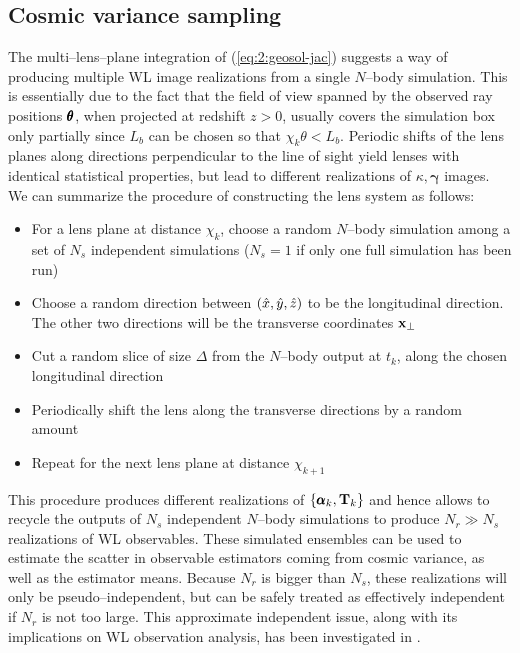 \subsection{Cosmic variance sampling}
\label{sec:3:sampling}
The multi--lens--plane integration of (\ref{eq:2:geosol-jac}) suggests a way of producing multiple WL image realizations from a single $N$--body simulation. This is essentially due to the fact that the field of view spanned by the observed ray positions $\pmb{\theta}$, when projected at redshift $z>0$, usually covers the simulation box only partially since $L_b$ can be chosen so that $\chi_k\theta<L_b$. Periodic shifts of the lens planes along directions perpendicular to the line of sight yield lenses with identical statistical properties, but lead to different realizations of $\kappa,\pmb{\gamma}$ images. We can summarize the procedure of constructing the lens system as follows:

\begin{itemize}
\item For a lens plane at distance $\chi_k$, choose a random $N$--body simulation among a set of $N_s$ independent simulations ($N_s=1$ if only one full simulation has been run)
\item Choose a random direction between $(\hat{x},\hat{y},\hat{z})$ to be the longitudinal direction. The other two directions will be the transverse coordinates $\mathbf{x}_\perp$
\item Cut a random slice of size $\Delta$ from the $N$--body output at $t_k$, along the chosen longitudinal direction
\item Periodically shift the lens along the transverse directions by a random amount
\item Repeat for the next lens plane at distance $\chi_{k+1}$
\end{itemize}
%
This procedure produces different realizations of $\{\pmb{\alpha}_k,\mathbf{T}_k\}$ and hence allows to recycle the outputs of $N_s$ independent $N$--body simulations to produce $N_r\gg N_s$ realizations of WL observables. These simulated ensembles can be used to estimate the scatter in observable estimators coming from cosmic variance, as well as the estimator means. Because $N_r$ is bigger than $N_s$, these realizations will only be pseudo--independent, but can be safely treated as effectively independent if $N_r$ is not too large. This approximate independent issue, along with its implications on WL observation analysis, has been investigated in \citep{PetriVariance}. 



